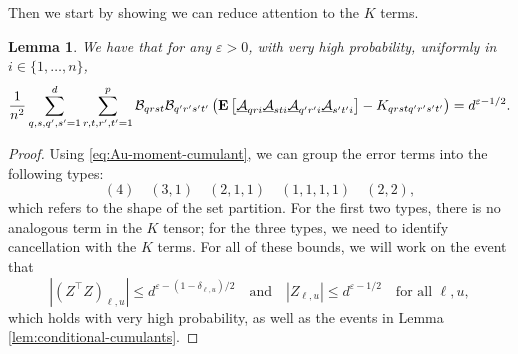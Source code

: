 \documentclass[letterpaper, 10pt, dvipsnames]{article}
\numberwithin{equation}{section}
\newcommand{\Au}{\underline{\mathcal{A}}}
\newcommand{\B}{\mathcal{B}}
\let\O\relax
\newcommand{\O}[1]{\mathcal{O}\left(#1\right)}
\newcommand{\Eb}{\mathbf{E}}
\newtheorem{lem}[ccounter]{Lemma}
\theoremstyle{definition}
\begin{document}
Then we start by showing we can reduce attention to the $K$ terms.
\begin{lem}\label{lem:baizhou-0}
  We have that for any $\varepsilon >0$, with very high probability, uniformly in $i\in\{1,\dots,n\}$, 
  \[
  \frac{1}{n^2}\sum_{q,s,q',s'=1}^d\sum_{r,t,r',t'=1}^p \B_{qrst}\B_{q'r's't'}
  \left(
    \Eb\left[
      \Au_{qri}\Au_{sti}\Au_{q'r'i}\Au_{s't'i}
      \right]
      -
      K_{qrstq'r's't'}
  \right)
  =
  \O{d^{\varepsilon-1/2}}.
  \]
\end{lem}
\begin{proof}
  Using \eqref{eq:Au-moment-cumulant}, we can group the error terms into the following types:
  \[
  (4) \quad (3,1) \quad (2,1,1) \quad (1,1,1,1) \quad (2,2),
  \]
  which refers to the shape of the set partition.  For the first two types, there is no analogous term in the $K$ tensor; for the three types, we need to identify cancellation with the $K$ terms.  For all of these bounds, we will work on the event that 
  \begin{equation}\label{eq:Z-bound}
  |(Z^{\top}Z)_{\ell,u}| \leq d^{\varepsilon-(1-\delta_{\ell,u})/2}
  \quad \text{and} \quad
  |Z_{\ell,u}| \leq d^{\varepsilon-1/2}
  \quad \text{for all $\ell,u$},
  \end{equation}
  which holds with very high probability, as well as the events in Lemma \ref{lem:conditional-cumulants}.


\end{proof}
\end{document}
